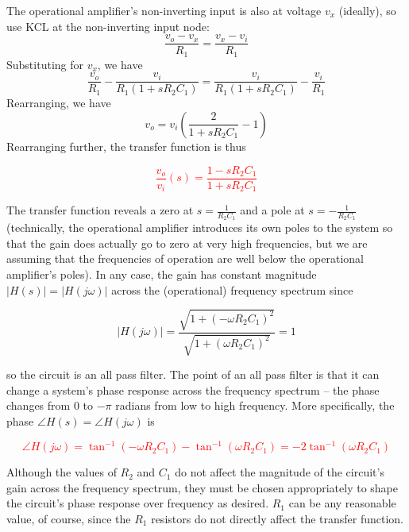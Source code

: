 The operational amplifier's non-inverting input is also at voltage $v_{x}$ (ideally), so use KCL at the non-inverting input node:
\begin{equation}
\frac{v_{o}-v_{x}}{R_{1}} = \frac{v_{x}-v_{i}}{R_{1}}
\end{equation}
Substituting for $v_{x}$, we have \begin{equation}
\frac{v_{o}}{R_{1}}-\frac{v_{i}}{R_{1}(1+sR_{2}C_{1})} = \frac{v_{i}}{R_{1}(1+sR_{2}C_{1})}-\frac{v_{i}}{R_{1}}
\end{equation}
Rearranging, we have
\begin{equation}
v_{o} = v_{i}\left(\frac{2}{1+sR_{2}C_{1}}-1\right)
\end{equation}
Rearranging further, the transfer function is thus

\textcolor{red}{
\begin{equation}
\frac{v_{o}}{v_{i}}(s) = \frac{1-sR_{2}C_{1}}{1+sR_{2}C_{1}}
\label{eq:1storderallpassfilter}
\end{equation}
}

The transfer function reveals a zero at $s = \frac{1}{R_{2}C_{1}}$ and a pole at $s = -\frac{1}{R_{2}C_{1}}$ (technically, the operational amplifier introduces its own poles to the system so that the gain does actually go to zero at very high frequencies, but we are assuming that the frequencies of operation are well below the operational amplifier's poles). In any case, the gain has constant magnitude $|H(s)| = |H(j\omega)|$ across the (operational) frequency spectrum since

\begin{equation}
|H(j\omega)| = \frac{\sqrt{1+(-\omega R_{2}C_{1})^{2}}}{\sqrt{1+(\omega R_{2}C_{1})^{2}}} = 1
\end{equation}

so the circuit is an all pass filter. The point of an all pass filter is that it can change a system's phase response across the frequency spectrum -- the phase changes from $0$ to $-\pi$ radians from low to high frequency. More specifically, the phase $\angle H(s) = \angle H(j\omega)$ is

\textcolor{red}{
\begin{equation}
\angle H(j\omega) = \tan^{-1}(-\omega R_{2}C_{1}) - \tan^{-1}(\omega R_{2}C_{1}) = -2\tan^{-1}(\omega R_{2}C_{1})
\label{eq:1storderallpassfilter_angle}
\end{equation}
}

Although the values of $R_{2}$ and $C_{1}$ do not affect the magnitude of the circuit's gain across the frequency spectrum, they must be chosen appropriately to shape the circuit's phase response over frequency as desired. $R_{1}$ can be any reasonable value, of course, since the $R_{1}$ resistors do not directly affect the transfer function.

